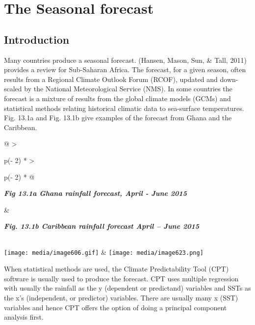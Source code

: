 \documentclass[
  letterpaper,
  DIV=11,
  numbers=noendperiod]{scrreprt}
\begin{document}

\chapter{The Seasonal forecast}\label{the-seasonal-forecast}

\section{Introduction}\label{introduction-12}

Many countries produce a seasonal forecast. (Hansen, Mason, Sun, \&
Tall, 2011) provides a review for Sub-Saharan Africa. The forecast, for
a given season, often results from a Regional Climate Outlook Forum
(RCOF), updated and down-scaled by the National Meteorological Service
(NMS). In some countries the forecast is a mixture of results from the
global climate models (GCMs) and statistical methods relating historical
climatic data to sea-surface temperatures. Fig. 13.1a and Fig. 13.1b
give examples of the forecast from Ghana and the Caribbean.

\begin{longtable}[]{@{}
  >{\raggedright\arraybackslash}p{(\columnwidth - 2\tabcolsep) * }
  >{\raggedright\arraybackslash}p{(\columnwidth - 2\tabcolsep) * }@{}}
\toprule\noalign{}
\begin{minipage}[b]{\linewidth}\raggedright
\textbf{\emph{Fig 13.1a Ghana rainfall forecast, April - June 2015}}
\end{minipage} & \begin{minipage}[b]{\linewidth}\raggedright
\textbf{\emph{Fig. 13.1b Caribbean rainfall forecast April -- June
2015}}
\end{minipage} \\
\midrule\noalign{}
\endhead
\bottomrule\noalign{}
\endlastfoot
\texttt{[image: media/image606.gif]} &
\texttt{[image: media/image623.png]} \\
\end{longtable}

When statistical methods are used, the Climate Predictability Tool (CPT)
software is usually used to produce the forecast. CPT uses multiple
regression with usually the rainfall as the y (dependent or predictand)
variables and SSTs as the x's (independent, or predictor) variables.
There are usually many x (SST) variables and hence CPT offers the option
of doing a principal component analysis first.
\end{document}
